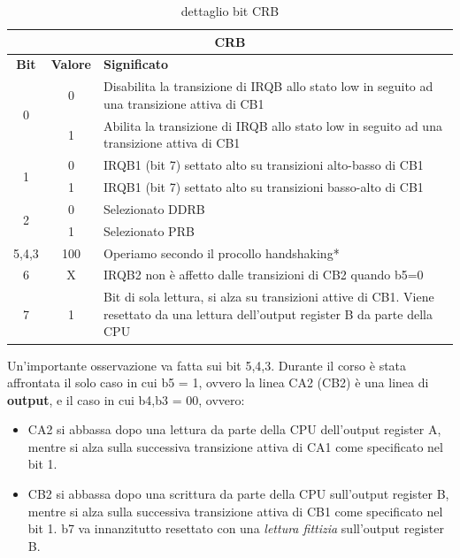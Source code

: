 \begin{table}[h!]
\centering
\begin{tabular}{|c|c|p{9cm}|}
    \hline
    \multicolumn{3}{|c|}{\textbf{CRB}} \\
    \hline
    \textbf{Bit} & \textbf{Valore} & \textbf{Significato} \\
    \hline
    \multirow{2}{*}{0} & 0 & Disabilita la transizione di IRQB allo stato low in seguito ad una transizione attiva di CB1 \\
                    & 1 &  Abilita la transizione di IRQB allo stato low in seguito ad una transizione attiva di CB1 \\
    \hline
    \multirow{2}{*}{1} & 0 & IRQB1 (bit 7) settato alto su transizioni alto-basso di CB1 \\
    & 1 & IRQB1 (bit 7) settato alto su transizioni basso-alto di CB1 \\
    \hline
    \multirow{2}{*}{2} & 0 & Selezionato DDRB \\
    & 1 & Selezionato PRB \\
    \hline
    5,4,3 & 100 & Operiamo secondo il procollo handshaking* \\
    
    \hline
    6 & X & IRQB2 non è affetto dalle transizioni di CB2 quando b5=0\\
    \hline
    7 & 1 & Bit di sola lettura, si alza su transizioni attive di CB1. Viene resettato da una lettura dell'output register B da parte della CPU \\
    \hline
\end{tabular}
\caption{dettaglio bit CRB}
\label{Tab:CRB}
\end{table}

Un'importante osservazione va fatta sui bit 5,4,3. Durante il corso è stata affrontata il solo caso in cui b5 = 1, ovvero la linea CA2 (CB2) è una linea di \textbf{output}, e il caso in cui b4,b3 = 00, ovvero:
\begin{itemize}
    \item CA2 si abbassa dopo una lettura da parte della CPU dell'output register A, mentre si alza sulla successiva transizione attiva di CA1 come specificato nel bit 1.
    \item CB2 si abbassa dopo una scrittura da parte della CPU sull'output register B, mentre si alza sulla successiva transizione attiva di CB1 come specificato nel bit 1. b7 va innanzitutto resettato con una \textit{lettura fittizia} sull'output register B.
\end{itemize}


